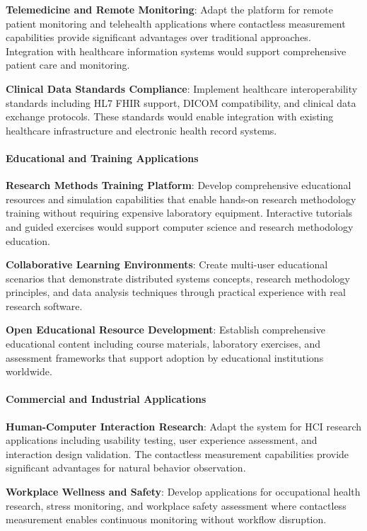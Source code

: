 \documentclass[11pt,a4paper]{article}
\begin{document}
\textbf{Telemedicine and Remote Monitoring}: Adapt the platform for remote patient monitoring and telehealth applications
where contactless measurement capabilities provide significant advantages over traditional approaches. Integration with
healthcare information systems would support comprehensive patient care and monitoring.

\textbf{Clinical Data Standards Compliance}: Implement healthcare interoperability standards including HL7 FHIR support,
DICOM compatibility, and clinical data exchange protocols. These standards would enable integration with existing
healthcare infrastructure and electronic health record systems.

\paragraph{Educational and Training Applications}

\textbf{Research Methods Training Platform}: Develop comprehensive educational resources and simulation capabilities that
enable hands-on research methodology training without requiring expensive laboratory equipment. Interactive tutorials
and guided exercises would support computer science and research methodology education.

\textbf{Collaborative Learning Environments}: Create multi-user educational scenarios that demonstrate distributed systems
concepts, research methodology principles, and data analysis techniques through practical experience with real research
software.

\textbf{Open Educational Resource Development}: Establish comprehensive educational content including course materials,
laboratory exercises, and assessment frameworks that support adoption by educational institutions worldwide.

\paragraph{Commercial and Industrial Applications}

\textbf{Human-Computer Interaction Research}: Adapt the system for HCI research applications including usability testing,
user experience assessment, and interaction design validation. The contactless measurement capabilities provide
significant advantages for natural behavior observation.

\textbf{Workplace Wellness and Safety}: Develop applications for occupational health research, stress monitoring, and
workplace safety assessment where contactless measurement enables continuous monitoring without workflow disruption.
\end{document}
